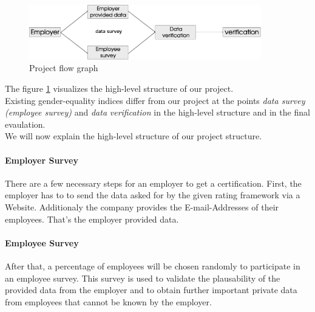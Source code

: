 \begin{figure}[H]
	\includegraphics[width=0.9\textwidth]{Bilder/bEquality-project-flow.eps}
	\caption{Project flow graph}
	\label{Project_flow_graph}
\end{figure}

The figure \ref{Project_flow_graph} visualizes the high-level structure of our project.\\
Existing gender-equality indices differ from our project at the points \textit{data survey (employee survey)} and \textit{data} \textit{verification} in the high-level structure and in the final evaulation.\\
We will now explain the high-level structure of our project structure.

\paragraph*{Employer Survey}
There are a few necessary steps for an employer to get a certification.
First, the employer has to to send the data asked for by the given rating framework via a Website. Additionaly the company provides the E-mail-Addresses of their employees. That’s the employer provided data.


\paragraph*{Employee Survey}
After that, a percentage of employees will be chosen randomly to participate in an employee survey. This survey is used to validate the plausability of the provided data from the employer and to obtain further important private data from employees that cannot be known by the employer.\\

